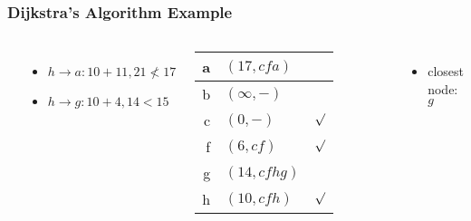 \documentclass[dvipsnames]{beamer}
\begin{document}
\begin{frame}
  \frametitle{Dijkstra's Algorithm Example}

  \begin{example}[from node $h$ - base distance=$10$]
    \begin{columns}
      \begin{center}
      \end{center}

      \begin{itemize}
        \item $h \rightarrow a: 10+11, 21 \nless 17$
        \item $h \rightarrow g: 10+4, 14 < 15$
      \end{itemize}

      \pause
      \begin{table}
        \begin{tabular}{r|l|c}
          a & $(17,cfa)$   & \\\hline
          b & $(\infty,-)$ & \\\hline
          c & $(0,-)$      & $\surd$ \\\hline
          f & $(6,cf)$     & $\surd$ \\\hline
          g & $(14,cfhg)$  & \\\hline
          h & $(10,cfh)$   & $\surd$
        \end{tabular}
      \end{table}

      \pause
      \begin{itemize}
        \item closest node: $g$
      \end{itemize}
    \end{columns}
  \end{example}
\end{frame}
\end{document}
